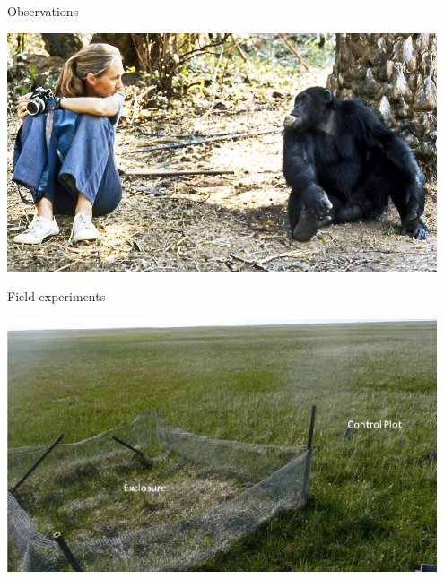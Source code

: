 \documentclass[12pt]{beamer}
\begin{document}
\begin{frame}

	\begin{flushright}
	  \Large \textcolor{boss2}{Observations} 
	\end{flushright}


  \begin{center}
    \includegraphics[width=0.95\textwidth]{figs/observation.jpg}
  \end{center}
  \let\thefootnote\relax{}
\end{frame}





\begin{frame}

	\begin{flushright}
	  \Large \textcolor{boss2}{Field experiments} 
	\end{flushright}

  \begin{center}
    \includegraphics[width=0.95\textwidth]{figs/field.png}
  \end{center}
  \let\thefootnote\relax{}

\end{frame}
\end{document}
